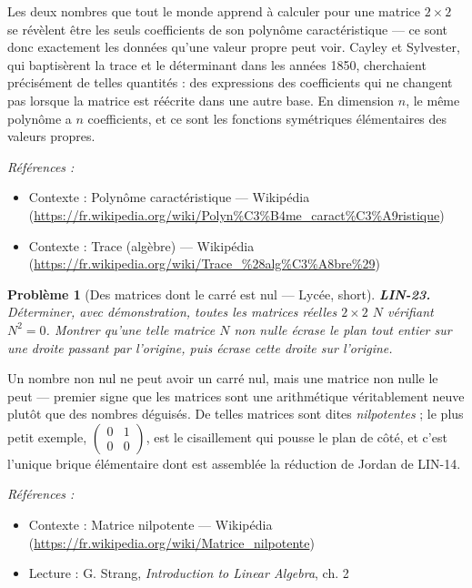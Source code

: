 \documentclass[11pt]{article}
\newtheorem{problem}{Problème}
\newenvironment{refs}{\par\small\noindent\emph{Références :}\begin{itemize}\setlength\itemsep{0pt}}{\end{itemize}\normalsize}
\begin{document}
\noindent Les deux nombres que tout le monde apprend à calculer pour une matrice
$2 \times 2$ se révèlent être les seuls coefficients de son polynôme caractéristique --- ce sont donc
exactement les données qu'une valeur propre peut voir. Cayley et Sylvester, qui baptisèrent la trace
et le déterminant dans les années 1850, cherchaient précisément de telles quantités : des expressions
des coefficients qui ne changent pas lorsque la matrice est réécrite dans une autre base. En
dimension $n$, le même polynôme a $n$ coefficients, et ce sont les fonctions symétriques
élémentaires des valeurs propres.

\begin{refs}
\item Contexte : Polynôme caractéristique --- Wikipédia (\url{https://fr.wikipedia.org/wiki/Polyn%C3%B4me_caract%C3%A9ristique})
\item Contexte : Trace (algèbre) --- Wikipédia (\url{https://fr.wikipedia.org/wiki/Trace_%28alg%C3%A8bre%29})
\end{refs}

\bigskip

\begin{problem}[{Des matrices dont le carré est nul --- Lycée, short}]
\textbf{LIN-23.} Déterminer, avec démonstration, toutes les matrices réelles
$2 \times 2$ $N$ vérifiant $N^2 = 0$. Montrer qu'une telle matrice $N$ non nulle écrase le
plan tout entier sur une droite passant par l'origine, puis écrase cette droite sur l'origine.
\end{problem}

\noindent Un nombre non nul ne peut avoir un carré nul, mais une matrice non nulle le peut ---
premier signe que les matrices sont une arithmétique véritablement neuve plutôt que des nombres
déguisés. De telles matrices sont dites \textit{nilpotentes} ; le plus petit exemple,
$\begin{pmatrix} 0 & 1 \\ 0 & 0 \end{pmatrix}$, est le cisaillement qui pousse le plan de
côté, et c'est l'unique brique élémentaire dont est assemblée la réduction de Jordan de LIN-14.

\begin{refs}
\item Contexte : Matrice nilpotente --- Wikipédia (\url{https://fr.wikipedia.org/wiki/Matrice_nilpotente})
\item Lecture : G. Strang, \textit{Introduction to Linear Algebra}, ch. 2
\end{refs}
\end{document}
